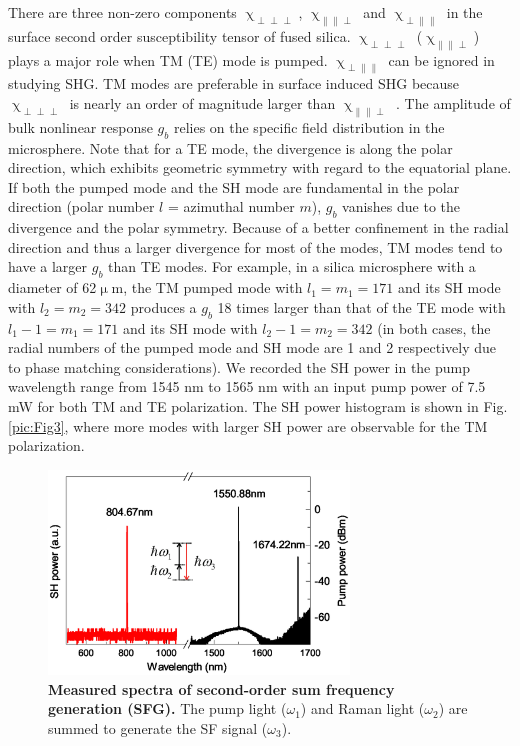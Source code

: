\documentclass[a4paper,8pt,hyperref, twocolumn]{article}
\begin{document}
There are three non-zero components $\upchi_{\perp \perp \perp}$, $\upchi_{\parallel \parallel \perp}$ and $\upchi_{\perp \parallel \parallel}$ in the surface second order susceptibility tensor of fused silica.  $\upchi_{\perp \perp \perp}$ ($\upchi_{\parallel \parallel \perp}$) plays a major role when TM (TE) mode is pumped. $\upchi_{\perp \parallel \parallel}$ can be ignored in studying SHG. TM modes are preferable in surface induced SHG because $\upchi_{\perp \perp \perp}$ is nearly an order of magnitude larger than $\upchi_{\parallel \parallel \perp}$ \cite{rodriguez2008calibration}. The amplitude of bulk nonlinear response $g_b$ relies on the specific field distribution in the microsphere.  Note that for a TE mode, the divergence is along the polar direction, which exhibits geometric symmetry with regard to the equatorial plane. If both the pumped mode and the SH mode are fundamental in the polar direction (polar number $l$ = azimuthal number $m$), $g_b$ vanishes due to the divergence and the polar symmetry. Because of a better confinement in the radial direction and thus a larger divergence for most of the modes, TM modes tend to have a larger $g_b$ than TE modes. For example, in a silica microsphere with a diameter of 62$\upmu$m, the TM pumped mode with $l_1=m_1=171$ and its SH mode with $l_2=m_2=342$ produces a $g_b$ 18 times larger than that of the TE mode with $l_1-1=m_1=171$ and its SH mode with $l_2-1=m_2=342$ (in both cases, the radial numbers of the pumped mode and SH mode are 1 and 2 respectively due to phase matching considerations). We recorded the SH power in the pump wavelength range from 1545 nm to 1565 nm with an input pump power of 7.5 mW for both TM and TE polarization. The SH power histogram is shown in Fig.\ref{pic:Fig3}, where more modes with larger SH power are observable for the TM polarization.



\begin{figure}[!ht]
\centering
\includegraphics[width=8cm]{Fig4.eps}
\caption{\textbf{Measured spectra of second-order sum frequency generation (SFG). }The pump light ($\omega_1$) and Raman light ($\omega_2$) are summed to generate the SF signal ($\omega_3$).}
\label{pic:Fig4}
\end{figure}
\end{document}
